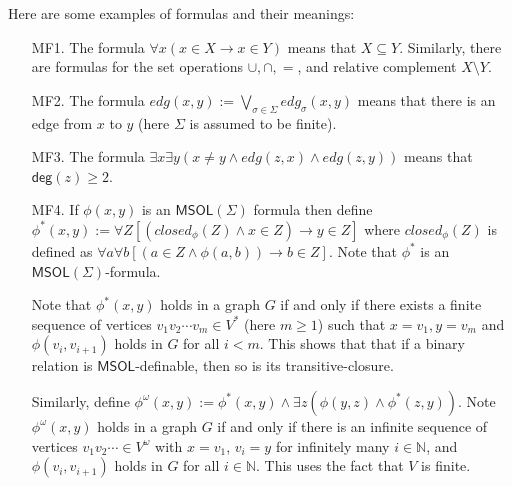 \documentclass{aamas2015}
\def\nat{\mathbb{N}}
\newcommand{\tup}[1]{\overline{#1}}
\def\deg{\textsf{deg}}
\def\msol{\mathsf{MSOL}}
\begin{document}
Here are some examples of formulas and their meanings:\label{ex:formulas}
\begin{enumerate}
\item[MF1.] The formula $\forall x (x \in X \to x \in Y)$ means that $X \subseteq Y$. Similarly, there are formulas for the set operations $\cup, \cap,=$, and relative complement $X \setminus Y$.
\item[MF2.] The formula $edg(x,y) := \bigvee_{\sigma \in \Sigma} edg_\sigma(x,y)$ means that there is an edge from $x$ to $y$ (here $\Sigma$ is assumed to be finite).

\item[MF3.] The formula $\exists x \exists y (x\neq y \wedge  edg(z,x) \wedge edg(z,y))$ means that $\deg(z) \geq 2$.

\item[MF4.] If $\phi(x,y)$ is an $\msol(\Sigma)$ formula then define $\phi^*(x,y) := \forall Z [(closed_{\phi}(Z) \wedge x \in Z) \to y \in Z]$ where $closed_{\phi}(Z)$ is defined as $\forall a \forall b[(a \in Z \wedge \phi(a,b)) \to b \in Z]$. Note that $\phi^*$ is an $\msol(\Sigma)$-formula.

Note that $\phi^*(x,y)$ holds in a graph $G$ if and only if there exists a finite sequence of vertices $v_1 v_2 \cdots v_m \in V^*$  (here $m \geq 1$) such that $x = v_1, y = v_m$ and $\phi(v_i,v_{i+1})$ holds in $G$ for all $i < m$. This shows that that if a binary relation is $\msol$-definable, then so is its transitive-closure. 

Similarly, define $\phi^\omega(x,y) := \phi^*(x,y) \wedge \exists z (\phi(y,z) \wedge \phi^{*}(z,y))$. Note $\phi^\omega(x,y)$ holds in a graph $G$ if and only if there is an infinite sequence of vertices $v_1 v_2 \cdots \in V^\omega$ with $x= v_1$, $v_i = y$ for infinitely many $i \in \nat$, and $\phi(v_i,v_{i+1})$ holds in $G$ for all $i \in \nat$. This uses the fact that $V$ is finite.



\end{enumerate}
\end{document}
